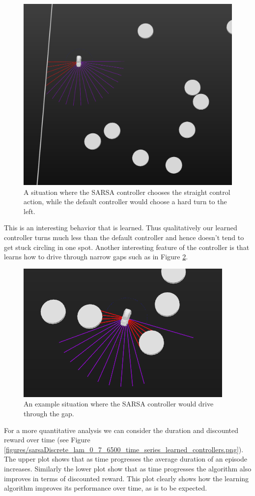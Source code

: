 \documentclass{article}
\begin{document}
\begin{figure}
\centering
\includegraphics[scale=0.4]{figures/driveStraightDirector.png}
\caption{A situation where the SARSA controller chooses the straight control action, while the default controller would choose a hard turn to the left.}
\label{figures/driveStraightDirector.png}
\end{figure}
%
%
This is an interesting behavior that is learned. Thus qualitatively our learned controller turns much less than the default controller and hence doesn't tend to get stuck circling in one spot. Another interesting feature of the controller is that learns how to drive through narrow gaps such as in Figure \ref{figures/narrowGap.png}.
%
%
\begin{figure}
\centering
\includegraphics[scale=0.6]{figures/narrowGap.png}
\caption{An example situation where the SARSA controller would drive through the gap.}
\label{figures/narrowGap.png}
\end{figure}
%
%
%
For a more quantitative analysis we can consider the duration and discounted reward over time (see Figure \ref{figures/sarsaDiscrete_lam_0_7_6500_time_series_learned_controllers.png}). The upper plot shows that as time progresses the average duration of an episode increases. Similarly the lower plot show that as time progresses the algorithm also improves in terms of discounted reward. This plot clearly shows how the learning algorithm improves its performance over time, as is to be expected. 
\end{document}
